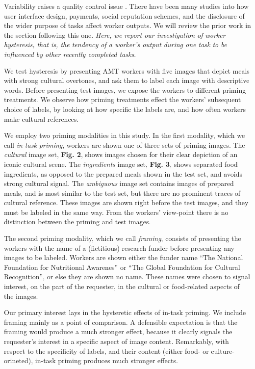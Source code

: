 \documentclass[a4paper]{report}
\begin{document}
Variability raises a quality control issue \cite{kazai2013analysis}. There 
have been many studies 
into how user interface design, payments, social reputation schemes, and the 
disclosure of the wider purpose of tasks affect worker outputs. We will 
review the prior work in the section following this one.
{\em Here, we report our investigation of worker {\em hysteresis}, that is, 
the tendency of a worker's output during one task to be influenced by other 
recently completed tasks}. 

We test hysteresis by presenting AMT workers with
five images that depict meals with strong cultural overtones, and ask them to
label each image with descriptive words.  Before presenting test images,
we expose the workers to different priming treatments.  We observe how priming
treatments effect the workers' subsequent choice of labels, by looking at 
how specific the labels are, and how often workers make 
cultural references.

We employ two priming modalities in this study.  
In the first modality, which we call \textit{in-task priming}, workers are 
shown one of three sets of priming images.  The \textit{cultural}
image set, \textbf{Fig. 2}, shows images chosen for their clear depiction of an
iconic cultural scene.  The \textit{ingredients} image set, \textbf{Fig. 3}, 
shows separated food ingredients, as opposed to the prepared meals shown in 
the test set, and avoids strong cultural signal.  The \textit{ambiguous} 
image set contains images of prepared meals, and is most similar to the test 
set, but there are no prominent traces of cultural reference.  These images 
are shown right
before the test images, and they must be labeled in the same way.  From the 
workers' view-point there is no distinction between the priming and test 
images. 

The second priming modality, which we call \textit{framing}, consists of
presenting the workers with the name of a (fictitious) research funder before
presenting any images to be labeled.  Workers are shown either the funder 
name  
``The National Foundation for Nutritional Awarenes'' or ``The Global
Foundation for Cultural Recognition'', or else they are shown no name.  These 
names were chosen to signal interest, on the part of the requester, in the
cultural or food-related aspects of the images.

Our primary interest lays in the hysteretic effects of in-task priming.  We
include framing mainly as a point of comparison.  A defensible expectation is
that the framing would produce a much stronger effect, because it clearly 
signals the requester's interest in a specific aspect of image content. 
Remarkably, with respect to the specificity of labels, and their content 
(either food- or culture-orineted), in-task priming produces much stronger 
effects.
\end{document}
